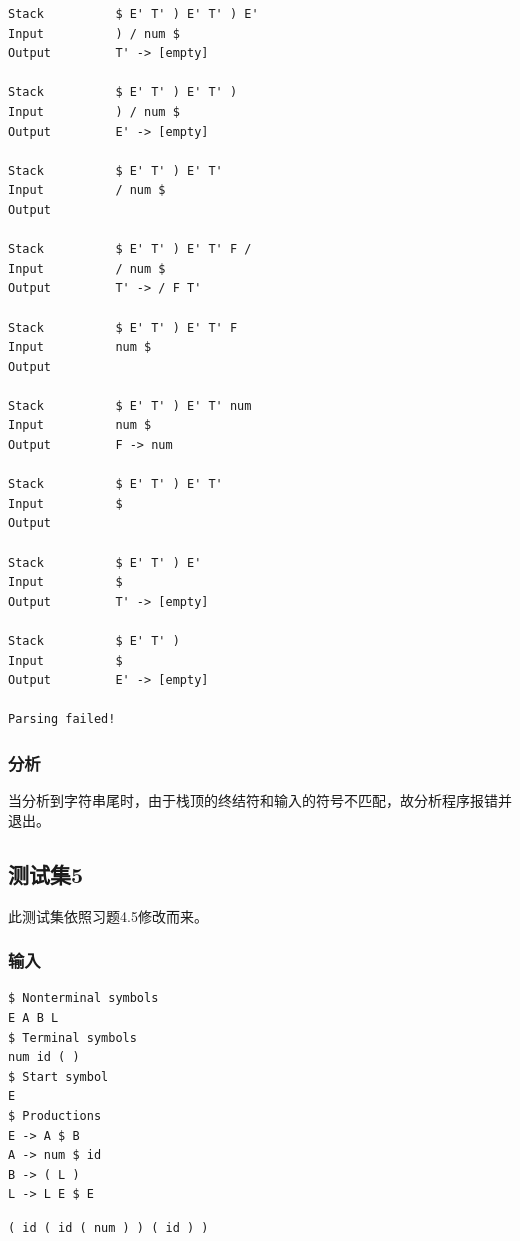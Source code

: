 \documentclass[lang=cn,11pt,a4paper,cite=authornum]{paper}
\begin{document}
\begin{code}
\begin{verbatim}
Stack          $ E' T' ) E' T' ) E' 
Input          ) / num $ 
Output         T' -> [empty] 

Stack          $ E' T' ) E' T' ) 
Input          ) / num $ 
Output         E' -> [empty] 

Stack          $ E' T' ) E' T' 
Input          / num $ 
Output         

Stack          $ E' T' ) E' T' F / 
Input          / num $ 
Output         T' -> / F T' 

Stack          $ E' T' ) E' T' F 
Input          num $ 
Output         

Stack          $ E' T' ) E' T' num 
Input          num $ 
Output         F -> num 

Stack          $ E' T' ) E' T' 
Input          $ 
Output         

Stack          $ E' T' ) E' 
Input          $ 
Output         T' -> [empty] 

Stack          $ E' T' ) 
Input          $ 
Output         E' -> [empty] 

Parsing failed!
\end{verbatim}
\end{code}

\subsubsection{分析}

当分析到字符串尾时，由于栈顶的终结符和输入的符号不匹配，故分析程序报错并退出。

\subsection{测试集5}

此测试集依照习题4.5修改而来。

\subsubsection{输入}

\begin{code}
\begin{verbatim}
$ Nonterminal symbols
E A B L
$ Terminal symbols
num id ( )
$ Start symbol
E
$ Productions
E -> A $ B
A -> num $ id
B -> ( L )
L -> L E $ E
\end{verbatim}
\end{code}

\begin{code}
\begin{verbatim}
( id ( id ( num ) ) ( id ) )
\end{verbatim}
\end{code}
\end{document}
